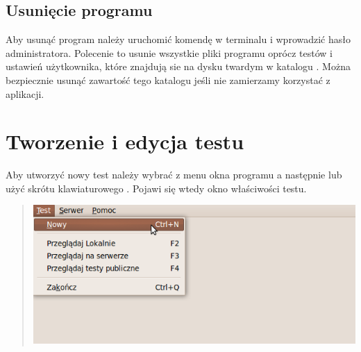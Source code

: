 \documentclass[letterpaper,10pt,polish]{sphinxmanual}
\begin{document}
\section{Usunięcie programu}
\label{index:usuniecie-programu}\label{index:id4}
Aby usunąć program należy uruchomić komendę  w terminalu i wprowadzić hasło administratora. Polecenie to usunie wszystkie pliki programu oprócz testów i ustawień użytkownika, które znajdują sie na dysku twardym w katalogu . Można bezpiecznie usunąć zawartość tego katalogu jeśli nie zamierzamy korzystać z aplikacji.


\chapter{Tworzenie i edycja testu}
\label{index:tworzenie-i-edycja-testu}\label{index:tworzenie-edycja}
Aby utworzyć nowy test należy wybrać z menu okna programu  a następnie  lub użyć skrótu klawiaturowego . Pojawi się wtedy okno właściwości testu.
\begin{quote}

\includegraphics{NowyTest.png}
\end{quote}
\end{document}
